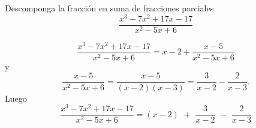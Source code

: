 \begin{ejemplo}

Descomponga la fracci\'on en suma de fracciones
parciales
\[
\displaystyle\frac{x^{3}- 7x^{2}+ 17x - 17}{x^{2}-5x + 6}
\]

$$\frac{x^{3}- 7x^{2}+17x -17}{x^{2}-5x+6} = x-2 + \frac{x-5}{x^{2}-5x+6}$$
y
$$ \frac{x-5}{x^{2}-5x+6} = \frac{x-5}{(x-2)(x-3)} = \frac{3}{x-2} - \frac{2}{x-3}.$$
Luego
$$\frac{x^{3}-7x^{2}+17x -17} {x^{2}-5x+6} =  (x-2) \,\,+ \,\, \frac{3}{x-2}\,\, - \,\,\frac{2}{x-3}$$
\end{ejemplo}


